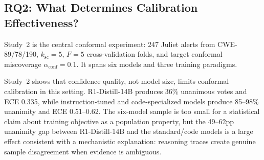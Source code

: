 \subsection{RQ2: What Determines Calibration Effectiveness?}

Study~2 is the central conformal experiment: 247 Juliet alerts from CWE-89/78/190, $k_{\mathrm{sc}}=5$, $F=5$ cross-validation folds, and target conformal miscoverage $\alpha_{\mathrm{conf}}=0.1$. It spans six models and three training paradigms.

\begin{table}[t]
\centering
\caption{Study~2 multi-model conformal calibration on 247 Juliet alerts (CWE-89/78/190, $k_{\mathrm{sc}}=5$, $F=5$, $\alpha_{\mathrm{conf}}=0.1$). Metrics are pre-escalation singleton-reject results.}
\label{tab:conformal_multimodel}
\small
\setlength{\tabcolsep}{3.5pt}
\end{table}

Study~2 shows that confidence quality, not model size, limits conformal calibration in this setting. R1-Distill-14B produces 36\% unanimous votes and ECE 0.335, while instruction-tuned and code-specialized models produce 85--98\% unanimity and ECE 0.51--0.62. The six-model sample is too small for a statistical claim about training objective as a population property, but the 49--62pp unanimity gap between R1-Distill-14B and the standard/code models is a large effect consistent with a mechanistic explanation: reasoning traces create genuine sample disagreement when evidence is ambiguous.

